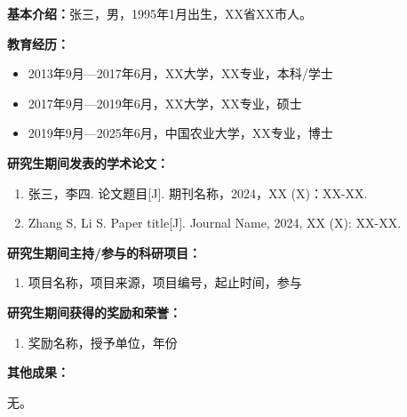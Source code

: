 \documentclass[]{CAUthesis}
\begin{document}
\begin{authorinfo}
  \textbf{基本介绍：}张三，男，1995年1月出生，XX省XX市人。

  \vspace{1ex}
  \textbf{教育经历：}
  \begin{itemize}[leftmargin=2em, nosep]
    \item 2013年9月—2017年6月，XX大学，XX专业，本科/学士
    \item 2017年9月—2019年6月，XX大学，XX专业，硕士
    \item 2019年9月—2025年6月，中国农业大学，XX专业，博士
  \end{itemize}

  \vspace{1ex}
  \textbf{研究生期间发表的学术论文：}
  \begin{enumerate}[leftmargin=2em, nosep]
    \item 张三，李四. 论文题目[J]. 期刊名称，2024，XX (X)：XX-XX.\
    \item Zhang S, Li S. Paper title[J]. Journal Name, 2024, XX (X): XX-XX.\
  \end{enumerate}

  \vspace{1ex}
  \textbf{研究生期间主持/参与的科研项目：}
  \begin{enumerate}[leftmargin=2em, nosep]
    \item 项目名称，项目来源，项目编号，起止时间，参与
  \end{enumerate}

  \vspace{1ex}
  \textbf{研究生期间获得的奖励和荣誉：}
  \begin{enumerate}[leftmargin=2em, nosep]
    \item 奖励名称，授予单位，年份
  \end{enumerate}

  \vspace{1ex}
  \textbf{其他成果：}

  无。
\end{authorinfo}
\end{document}
